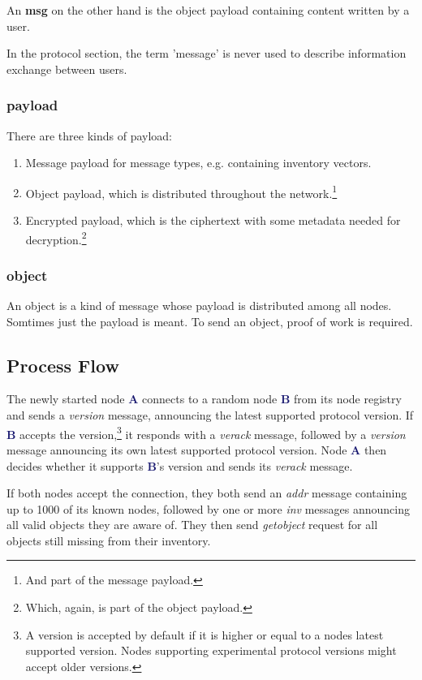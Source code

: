 \documentclass{bfh}
\newcommand{\msg}[1]{\textit{\textcolor{RedOrange}{#1}}}
\newcommand{\obj}[1]{\textbf{\textcolor{OliveGreen}{#1}}}
\newcommand{\node}[1]{\textbf{\textcolor{MidnightBlue}{#1}}}
\begin{document}
  An \obj{msg} on the other hand is the object payload containing content written by a user.

  In the protocol section, the term 'message' is never used to describe information exchange between users.

  \subsubsection{payload}
  There are three kinds of payload:
  \begin{enumerate}
  \item Message payload for message types, e.g. containing inventory vectors.
  \item Object payload, which is distributed throughout the network.\footnote{And part of the message payload.}
  \item Encrypted payload, which is the ciphertext with some metadata needed for decryption.\footnote{Which, again, is part of the object payload.}
  \end{enumerate}

  \subsubsection{object}
  An object is a kind of message whose payload is distributed among all nodes. Somtimes just the payload is meant. To send an object, proof of work is required.

  \subsection{Process Flow}

  The newly started node \node{A} connects to a random node \node{B} from its node registry and sends a \msg{version} message, announcing the latest supported protocol version. If \node{B} accepts the version,\footnote{A version is accepted by default if it is higher or equal to a nodes latest supported version. Nodes supporting experimental protocol versions might accept older versions.} it responds with a \msg{verack} message, followed by a \msg{version} message announcing its own latest supported protocol version. Node \node{A} then decides whether it supports \node{B}'s version and sends its \msg{verack} message.

  If both nodes accept the connection, they both send an \msg{addr} message containing up to 1000 of its known nodes, followed by one or more \msg{inv} messages announcing all valid objects they are aware of. They then send \msg{getobject} request for all objects still missing from their inventory.
\end{document}
